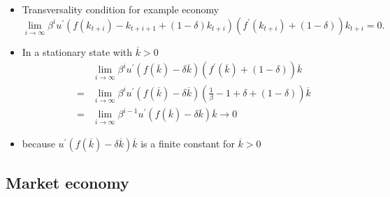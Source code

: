 \documentclass[notes=show]{beamer}
\begin{document}
\begin{frame}%


\begin{itemize}
\item Transversality condition for example economy%
\[
\lim_{i\rightarrow \infty }\beta ^{i}u^{\prime }\left(
f(k_{t+i})-k_{t+i+1}+(1-\delta )k_{t+i}\right) \left( f^{\prime
}(k_{t+i})+(1-\delta )\right) k_{t+i}=0. 
\]

\item In a stationary state with $\overline{k}>0$ 
\begin{eqnarray*}
&&\lim_{i\rightarrow \infty }\beta ^{i}u^{\prime }\left( f(\overline{k}%
)-\delta \overline{k}\right) \left( f^{\prime }(\overline{k})+(1-\delta
)\right) \overline{k} \\
&=&\lim_{i\rightarrow \infty }\beta ^{i}u^{\prime }\left( f(\overline{k}%
)-\delta \overline{k}\right) \left( \frac{1}{\beta }-1+\delta +(1-\delta
)\right) \overline{k} \\
&=&\lim_{i\rightarrow \infty }\beta ^{i-1}u^{\prime }\left( f(\overline{k}%
)-\delta \overline{k}\right) \overline{k}\rightarrow 0
\end{eqnarray*}

\item because $u^{\prime }\left( f(\overline{k})-\delta \overline{k}\right) 
\overline{k}$ is a finite constant for $\overline{k}>0$
\end{itemize}

\end{frame}%

\subsection{Market economy}
\end{document}

